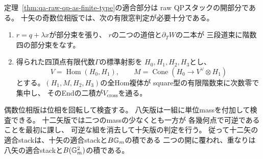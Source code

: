 \begin{theorem}[AS適合QPの開判定と一mass被覆]
\label{thm:qa-raw-qp-as-open-mass-charts}
定理~\ref{thm:qa-raw-qp-as-finite-type}の適合部分は
raw QPスタックの開部分である。
十矢の奇数位相版では、次の有限窓判定が必要十分である。
\begin{enumerate}
\item $r=q+\lambda x$が部分束を張り、
$r$の二つの道倍と$\partial_T W$の二本が
三段道束に階数四の部分束をなす。
\item 得られた四頂点有限代数$\Gamma$の標準射影を
$H_0,H_1,H_2,H_3$とし、
\[
 V=\operatorname{Hom}(H_0,H_1),\qquad
 M=\operatorname{Cone}(H_0\longrightarrow V^\vee\otimes H_1)
\]
とする。$(H_1,M,H_2,H_3)$の全Hom複体が
square型の有限階数束に次数零で集中し、
そのEndの二積が$V_{\mathrm{cross}}$を通る。
\end{enumerate}
偶数位相版は位相を回転して検査する。
八矢版は一組に単位massを付加して検査できる。
十二矢版では二つのmassの少なくとも一方が
各幾何点で可逆であることを最初に課し、
可逆な組を消去して十矢版の判定を行う。
従って十二矢の適合stackは、十矢の適合stackと$B\mathbb G_m$の積である
二つの開に覆われ、重なりは八矢の適合stackと$B(\mathbb G_m^2)$の積である。
\end{theorem}
